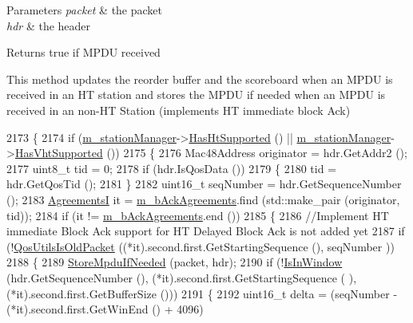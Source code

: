 \begin{DoxyParams}{Parameters}
{\em packet} & the packet \\
\hline
{\em hdr} & the header \\
\hline
\end{DoxyParams}
\begin{DoxyReturn}{Returns}
true if M\+P\+DU received
\end{DoxyReturn}
This method updates the reorder buffer and the scoreboard when an M\+P\+DU is received in an HT station and stores the M\+P\+DU if needed when an M\+P\+DU is received in an non-\/\+HT Station (implements HT immediate block Ack) 
\begin{DoxyCode}
2173 \{
2174   \textcolor{keywordflow}{if} (\hyperlink{classns3_1_1MacLow_a1c7f45f071f9e5eb97764f64e5cdaf1b}{m\_stationManager}->\hyperlink{classns3_1_1WifiRemoteStationManager_ac792dc8f3c77d507d25de0b87b52608c}{HasHtSupported} () || 
      \hyperlink{classns3_1_1MacLow_a1c7f45f071f9e5eb97764f64e5cdaf1b}{m\_stationManager}->\hyperlink{classns3_1_1WifiRemoteStationManager_afae2836c7785854272d73bf33e58c95a}{HasVhtSupported} ())
2175     \{
2176       Mac48Address originator = hdr.GetAddr2 ();
2177       uint8\_t tid = 0;
2178       \textcolor{keywordflow}{if} (hdr.IsQosData ())
2179         \{
2180           tid = hdr.GetQosTid ();
2181         \}
2182       uint16\_t seqNumber = hdr.GetSequenceNumber ();
2183       \hyperlink{classns3_1_1MacLow_a7876cc9b328cdb0508f2a7b7647eab10}{AgreementsI} it = \hyperlink{classns3_1_1MacLow_a53482df1a7e6f136cfa8ce50fa10adc2}{m\_bAckAgreements}.find (std::make\_pair (originator, tid));
2184       \textcolor{keywordflow}{if} (it != \hyperlink{classns3_1_1MacLow_a53482df1a7e6f136cfa8ce50fa10adc2}{m\_bAckAgreements}.end ())
2185         \{
2186           \textcolor{comment}{//Implement HT immediate Block Ack support for HT Delayed Block Ack is not added yet}
2187           \textcolor{keywordflow}{if} (!\hyperlink{group__wifi_ga5cb9ea723837c5a036e622612f2d0bb0}{QosUtilsIsOldPacket} ((*it).second.first.GetStartingSequence (), seqNumber
      ))
2188             \{
2189               \hyperlink{classns3_1_1MacLow_aeada564fc806b1e258a3ef24dd867fdf}{StoreMpduIfNeeded} (packet, hdr);
2190               \textcolor{keywordflow}{if} (!\hyperlink{classns3_1_1MacLow_a442078ddeb869fa7e76f35f32e0533c2}{IsInWindow} (hdr.GetSequenceNumber (), (*it).second.first.GetStartingSequence (
      ), (*it).second.first.GetBufferSize ()))
2191                 \{
2192                   uint16\_t delta = (seqNumber - (*it).second.first.GetWinEnd () + 4096) %

\end{DoxyCode}
